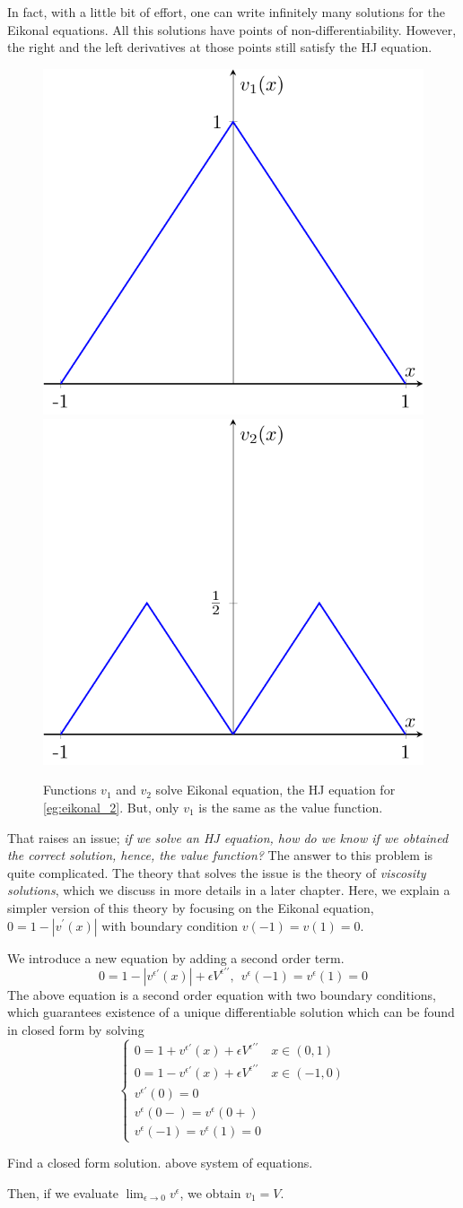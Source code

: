 \documentclass[11pt]{book}
\begin{document}
 In fact, with a little bit of effort, one can write infinitely many solutions for the Eikonal equations. All this solutions have points of non-differentiability. However, the right and the left derivatives at those points still satisfy the HJ equation. 
\begin{figure}
    \centering
    \includegraphics[width=0.25\linewidth]{Control_lecture_notes/Figs/v1.pdf}\includegraphics[width=0.25\linewidth]{Control_lecture_notes/Figs/v2.pdf}
    \caption{Functions $v_1$ and $v_2$ solve Eikonal equation, the HJ equation for \ref{eg:eikonal_2}. But, only  $v_1$ is the same as the value function.}
    \label{fig:v1v2}
\end{figure}
That raises an issue; \emph{if we solve an HJ equation, how do we know if we obtained the correct solution, hence, the value function?} The answer to this problem is quite complicated. The theory that solves the issue is the theory of \emph{viscosity solutions}, which we discuss in more details in a later chapter. Here, we explain a simpler version of this theory by focusing on the Eikonal equation, $0=1-|v^{\prime}(x)|$ with boundary condition $v(-1)=v(1)=0$. 

We introduce a new equation by adding a second order term. 
\[
0=1-|v^{\epsilon\prime}(x)|+\epsilon V^{\epsilon\prime\prime}, ~~ v^{\epsilon}(-1)=v^{\epsilon}(1)=0
\]
The above equation is a second order equation with two boundary conditions, which guarantees existence of a unique differentiable solution which can be found in closed form by solving
\[
\begin{cases}
    0=1+v^{\epsilon\prime}(x)+\epsilon V^{\epsilon\prime\prime}& x\in(0,1)\\
    0=1-v^{\epsilon\prime}(x)+\epsilon V^{\epsilon\prime\prime}& x\in(-1,0)\\
    v^{\epsilon\prime}(0)=0&\\
    v^{\epsilon}(0-)=v^{\epsilon}(0+)&\\
    v^{\epsilon}(-1)=v^{\epsilon}(1)=0
\end{cases}
\]
\begin{ex}
    Find a closed form solution. above system of equations.
\end{ex}
Then, if we evaluate $\lim_{\epsilon\to0}v^{\epsilon}$, we obtain $v_1=V$.
\end{document}

